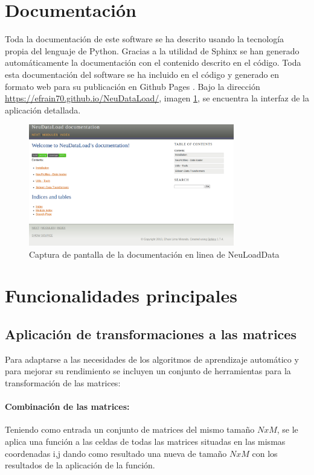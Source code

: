 \section{Documentación}
Toda la documentación de este software se ha descrito usando la tecnología propia del lenguaje de Python. Gracias a la utilidad de Sphinx \cite{OverviewDocumentation} se han generado automáticamente la documentación con el contenido descrito en el código. Toda esta documentación del software se ha incluido en el código y generado en formato web para su publicación en Github Pages \cite{GitHubLive.}. Bajo la dirección \url{https://efrain70.github.io/NeuDataLoad/}, imagen \ref{figure:documentacion}, se encuentra la interfaz de la aplicación detallada.

\begin{figure}[H]
\centering
\includegraphics[width=0.8\textwidth]{figs/software/docu.png}
\caption{Captura de pantalla de la documentación en linea de NeuLoadData}
\label{figure:documentacion}
\end{figure}

\section{Funcionalidades principales}

\subsection{Aplicación de transformaciones a las matrices}
Para adaptarse a las necesidades de los algoritmos de aprendizaje automático y para mejorar su rendimiento se incluyen un conjunto de herramientas para la transformación de las matrices:

\paragraph{Combinación de las matrices:}
Teniendo como entrada un conjunto de matrices del mismo tamaño $NxM$, se le aplica una función a las celdas de todas las matrices situadas en las mismas coordenadas i,j dando como resultado una nueva de tamaño $NxM$ con los resultados de la aplicación de la función.

